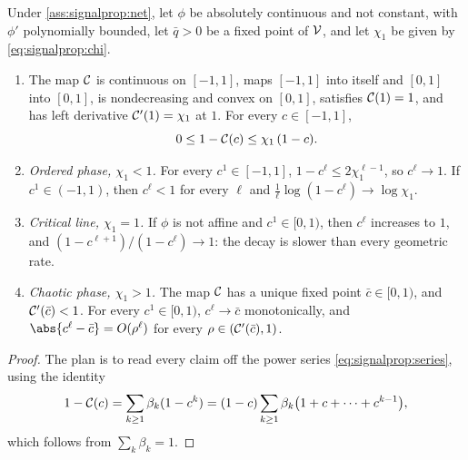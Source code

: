 \begin{refsection}
\begin{theorem}\label{thm:signalprop:phase}
Under \cref{ass:signalprop:net}, let $\phi$ be absolutely continuous and not constant, with $\phi'$ polynomially bounded, let $\bar q>0$ be a fixed point of $\mathcal{V}$, and let $\chi_1$ be given by \eqref{eq:signalprop:chi}.
\begin{enumerate}
\item The map $\mathcal{C}$ is continuous on $[-1,1]$, maps $[-1,1]$ into itself and $[0,1]$ into $[0,1]$, is nondecreasing and convex on $[0,1]$, satisfies $\mathcal{C}(1)=1$, and has left derivative $\mathcal{C}'(1)=\chi_1$ at $1$. For every $c\in[-1,1]$,
\begin{equation}\label{eq:signalprop:contraction}
  0\le1-\mathcal{C}(c)\le\chi_1\,(1-c).
\end{equation}
\item \emph{Ordered phase, $\chi_1<1$.} For every $c^1\in[-1,1]$, $1-c^\ell\le2\chi_1^{\ell-1}$, so $c^\ell\to1$. If $c^1\in(-1,1)$, then $c^\ell<1$ for every $\ell$ and $\frac1\ell\log(1-c^\ell)\to\log\chi_1$.
\item \emph{Critical line, $\chi_1=1$.} If $\phi$ is not affine and $c^1\in[0,1)$, then $c^\ell$ increases to $1$, and $(1-c^{\ell+1})/(1-c^\ell)\to1$: the decay is slower than every geometric rate.
\item \emph{Chaotic phase, $\chi_1>1$.} The map $\mathcal{C}$ has a unique fixed point $\bar c\in[0,1)$, and $\mathcal{C}'(\bar c)<1$. For every $c^1\in[0,1)$, $c^\ell\to\bar c$ monotonically, and $\abs{c^\ell-\bar c}=O(\rho^\ell)$ for every $\rho\in(\mathcal{C}'(\bar c),1)$.
\end{enumerate}
\end{theorem}

\begin{proof}
The plan is to read every claim off the power series \eqref{eq:signalprop:series}, using the identity
\begin{equation}\label{eq:signalprop:telescope}
  1-\mathcal{C}(c)=\sum_{k\ge1}\beta_k(1-c^k)=(1-c)\sum_{k\ge1}\beta_k\bigl(1+c+\dots+c^{k-1}\bigr),
\end{equation}
which follows from $\sum_k\beta_k=1$.


\end{proof}
\end{refsection}
